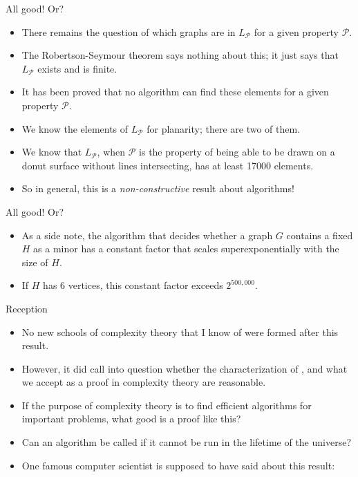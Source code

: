 \begin{frame}{All good! Or?}
   \begin{itemize}
  \item {
  There remains the question of which graphs are in $L_{\mathcal{P}}$ for a given property $\mathcal{P}$. 
   }\pause
  \item { 
  The Robertson-Seymour theorem says nothing about this; it just says that $L_{\mathcal{P}}$ exists and is finite.
  } \pause
  \item {
  It has been proved that no algorithm can find these elements for a given property $\mathcal{P}$. 
  } \pause
  \item {
  We know the elements of $L_{\mathcal{P}}$ for planarity; there are two of them. 
  } \pause
  \item {
  We know that $L_{\mathcal{P}}$, when $\mathcal{P}$ is the property of being able to be drawn on a donut surface without lines intersecting, has at least 17000 elements.
  } \pause
   \item {
  So in general, this is a \emph{non-constructive} result about algorithms!
  }
 
  \end{itemize}
\end{frame}

\begin{frame}{All good! Or?}
\begin{itemize}
 \item {
  As a side note, the algorithm that decides whether a graph $G$ contains a fixed $H$ as a minor has a constant factor that scales superexponentially with the size of $H$. 
  } \pause
  \item {
  If $H$ has 6 vertices, this constant factor exceeds $2^{500,000}$.
  }
  \end{itemize}
\end{frame}

\begin{frame}{Reception}
   \begin{itemize}
  \item {
  No new schools of complexity theory that I know of were formed after this result.
   }\pause
  \item { 
  However, it did call into question whether the characterization of , and what we accept as a proof in complexity theory are reasonable.
  } \pause
  \item {
  If the purpose of complexity theory is to find efficient algorithms for important problems, what good is a proof like this?
  } \pause
  \item {
  Can an algorithm be called  if it cannot be run in the lifetime of the universe?
  } \pause
  \item {
  One famous computer scientist is supposed to have said about this result:
  
  \emph{}
  }
  \end{itemize}
\end{frame}

